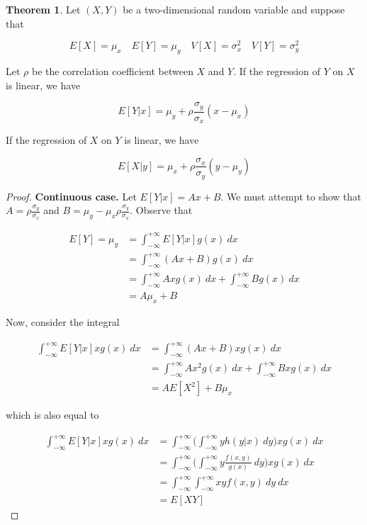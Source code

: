 \documentclass[10pt, oneside]{article}   	%
\theoremstyle{definition}
\newtheorem*{thm*}{Theorem}
\begin{document}
\begin{enumerate}[label=7.\arabic*]
  \begin{thm*}
  Let $(X,Y)$ be a two-dimensional random variable and suppose that
  
  \[ E[X] = \mu_x \quad E[Y] = \mu_y \quad V[X] = \sigma^2_x \quad V[Y] = \sigma^2_y \]
  
  Let $\rho$ be the correlation coefficient between $X$ and $Y$. If the regression of $Y$ on $X$ is linear, we have
  
  \[ E[Y | x] = \mu_y + \rho \frac{\sigma_y}{\sigma_x} (x - \mu_x) \]
  
  If the regression of $X$ on $Y$ is linear, we have
  
  \[ E[X | y] = \mu_x + \rho \frac{\sigma_x}{\sigma_y} (y - \mu_y) \]
    
  \end{thm*}
  
  \begin{proof}
  \textbf{Continuous case.} Let $E[Y | x] = Ax + B$. We must attempt to show that $A = \rho \frac{\sigma_y}{\sigma_x}$ and $B = \mu_y -\mu_x \rho \frac{\sigma_y}{\sigma_x}$. Observe that
  
  \begin{align*}
  E[Y] = \mu_y &= \int^{+\infty}_{-\infty} E[Y | x] g(x) \ dx \\
  &= \int^{+\infty}_{-\infty} (Ax + B) g(x) \ dx \\
  &= \int^{+\infty}_{-\infty} Ax g(x) \ dx + \int^{+\infty}_{-\infty} B g(x) \ dx \\
  &= A \mu_x + B
  \end{align*}
  
  Now, consider the integral
  
  \begin{align*}
  \int^{+\infty}_{-\infty} E[Y | x] x g(x) \ dx &= \int^{+\infty}_{-\infty} (Ax + B) x g(x) \ dx \\
  &= \int^{+\infty}_{-\infty} Ax^2 g(x) \ dx + \int^{+\infty}_{-\infty} B x g(x) \ dx \\
  &= A E[X^2] + B \mu_x
  \end{align*}
  
  which is also equal to
  
  \begin{align*}
  \int^{+\infty}_{-\infty} E[Y | x] x g(x) \ dx &= \int^{+\infty}_{-\infty} \Bigg( \int^{+\infty}_{-\infty} y h(y | x) \ dy \Bigg) x g(x) \ dx \\
  &= \int^{+\infty}_{-\infty} \Bigg( \int^{+\infty}_{-\infty} y \frac{f(x,y)}{g(x)} \ dy \Bigg) x g(x) \ dx \\
  &= \int^{+\infty}_{-\infty} \int^{+\infty}_{-\infty} xy f(x,y) \ dy \ dx \\
  &= E[XY]
  \end{align*}
  

\end{proof}
\end{enumerate}
\end{document}
